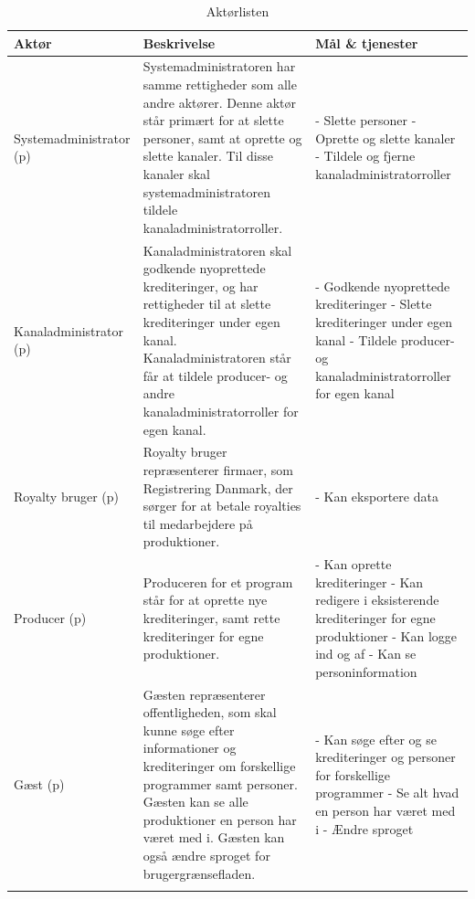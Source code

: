 \begin{longtable}{|p{3.7cm}|p{6.15cm}|p{6.15cm}|}
\hline
\textbf{Aktør} & \textbf{Beskrivelse} & \textbf{Mål \& tjenester} \\
\hline
Systemadministrator (p) 
& Systemadministratoren har samme rettigheder som alle andre aktører. Denne aktør står primært for at slette personer, samt at oprette og slette kanaler. Til disse kanaler skal systemadministratoren tildele kanaladministratorroller.
& - Slette personer \newline - Oprette og slette kanaler \newline - Tildele og fjerne kanaladministratorroller\\

\hline
Kanaladministrator (p) 
& Kanaladministratoren skal godkende nyoprettede krediteringer, og har rettigheder til at slette krediteringer under egen kanal. Kanaladministratoren står får at tildele producer- og andre kanaladministratorroller for egen kanal.
& - Godkende nyoprettede krediteringer \newline - Slette krediteringer under egen kanal \newline - Tildele producer- og kanaladministratorroller for egen kanal\\

\hline
Royalty bruger (p) 
& Royalty bruger repræsenterer firmaer, som Registrering Danmark, der sørger for at betale royalties til medarbejdere på produktioner.
& - Kan eksportere data \\

\hline
Producer (p) 
& Produceren for et program står for at oprette nye krediteringer, samt rette krediteringer for egne produktioner.
& - Kan oprette krediteringer \newline - Kan redigere i eksisterende krediteringer for egne produktioner \newline - Kan logge ind og af \newline - Kan se personinformation \\

\hline
Gæst (p) 
& Gæsten repræsenterer offentligheden, som skal kunne søge efter informationer og krediteringer om forskellige programmer samt personer. Gæsten kan se alle produktioner en person har været med i. Gæsten kan også ændre sproget for brugergrænsefladen.
& - Kan søge efter og se krediteringer og personer for forskellige programmer \newline - Se alt hvad en person har været med i \newline - Ændre sproget\\

\hline
\caption{Aktørlisten}
\label{table:aktørlist}
\end{longtable}

